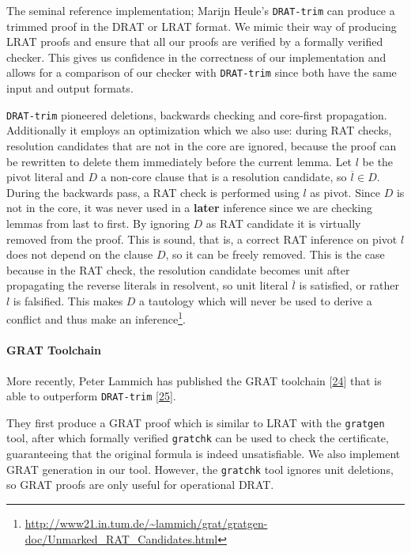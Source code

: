 \documentclass[
]{report}
\begin{document}
The seminal reference implementation; Marijn Heule's \texttt{DRAT-trim}
can produce a trimmed proof in the DRAT or LRAT format. We mimic their
way of producing LRAT proofs and ensure that all our proofs are verified
by a formally verified checker. This gives us confidence in the
correctness of our implementation and allows for a comparison of our
checker with \texttt{DRAT-trim} since both have the same input and
output formats.

\texttt{DRAT-trim} pioneered deletions, backwards checking and
core-first propagation. Additionally it employs an optimization which we
also use: during RAT checks, resolution candidates that are not in the
core are ignored, because the proof can be rewritten to delete them
immediately before the current lemma. Let \(l\) be the pivot literal and
\(D\) a non-core clause that is a resolution candidate, so
\(\overline{l} \in D\). During the backwards pass, a RAT check is
performed using \(l\) as pivot. Since \(D\) is not in the core, it was
never used in a \textbf{later} inference since we are checking lemmas
from last to first. By ignoring \(D\) as RAT candidate it is virtually
removed from the proof. This is sound, that is, a correct RAT inference
on pivot \(l\) does not depend on the clause \(D\), so it can be freely
removed. This is the case because in the RAT check, the resolution
candidate becomes unit after propagating the reverse literals in
resolvent, so unit literal \(\overline{l}\) is satisfied, or rather
\(l\) is falsified. This makes \(D\) a tautology which will never be
used to derive a conflict and thus make an inference\footnote{\url{http://www21.in.tum.de/~lammich/grat/gratgen-doc/Unmarked_RAT_Candidates.html}}.

\paragraph{GRAT Toolchain}

More recently, Peter Lammich has published the GRAT toolchain
{[}\protect\hyperlink{ref-DBLP:confux2fsatux2fLammich17}{24}{]} that is
able to outperform \texttt{DRAT-trim}
{[}\protect\hyperlink{ref-DBLP:confux2fcadeux2fLammich17}{25}{]}.

They first produce a GRAT proof which is similar to LRAT with the
\texttt{gratgen} tool, after which formally verified \texttt{gratchk}
can be used to check the certificate, guaranteeing that the original
formula is indeed unsatisfiable. We also implement GRAT generation in
our tool. However, the \texttt{gratchk} tool ignores unit deletions, so
GRAT proofs are only useful for operational DRAT.
\end{document}
